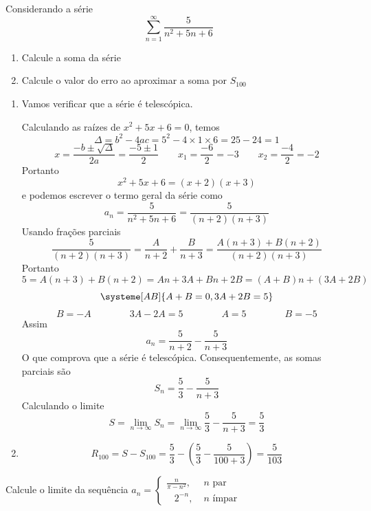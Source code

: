 \documentclass[a4paper,12pt,fleqn]{article}
\begin{document}

Considerando a série
\[
  \sum_{n=1}^{\infty} \frac{5}{n^2 + 5n + 6}
\]
\begin{enumerate}[label=\alph*)]
  \item Calcule a soma da série
  \item Calcule o valor do erro ao aproximar a soma por \(S_{100}\)
\end{enumerate}

\begin{answer}
  \begin{enumerate}[label=\alph*)]
    \item Vamos verificar que a série é telescópica.

    Calculando as raízes de \(x^2 + 5x + 6=0\), temos
    \[
      \Delta
      = b^2 - 4ac
      = 5^2 - 4\times 1\times 6
      = 25 - 24
      = 1
    \]
    \[
      x
      = \frac{-b\pm \sqrt{\Delta}}{2a}
      = \frac{-5\pm 1}{2}
      \qquad
      x_1 = \frac{-6}{2} = -3
      \qquad
      x_2 = \frac{-4}{2} = -2
    \]
    Portanto
    \[
      x^2 + 5x + 6 = (x+2)(x+3)
    \]
    e podemos escrever o termo geral da série como
    \[
      a_n
      = \frac{5}{n^2 + 5n + 6}
      = \frac{5}{(n+2)(n+3)}
    \]
    Usando frações parciais
    \[
      \frac{5}{(n+2)(n+3)}
      = \frac{A}{n+2} + \frac{B}{n+3}
      = \frac{A(n+3) + B(n+2)}{(n+2)(n+3)}
    \]
    Portanto
    \[
      5
      = A(n+3) + B(n+2)
      = An + 3A + Bn + 2B
      = (A+B)n + (3A+2B)
    \]
    \[
      \systeme[AB]
      {
        A+B=0,
        3A+2B=5
      }
    \]
    \[
      B = -A
      \qquad\qquad
      3A-2A = 5
      \qquad\qquad
      A = 5
      \qquad\qquad
      B = -5
    \]
    Assim
    \[
      a_n = \frac{5}{n+2} - \frac{5}{n+3}
    \]
    O que comprova que a série é telescópica. Consequentemente, as somas parciais são
    \[
      S_n = \frac{5}{3} - \frac{5}{n+3}
    \]
    Calculando o limite
    \[
      S
      = \lim_{n\to\infty} S_n
      = \lim_{n\to\infty} \frac{5}{3} - \frac{5}{n+3}
      = \frac{5}{3}
    \]
    \item
    \[
      R_{100}
      = S - S_{100}
      = \frac{5}{3} - \left(\frac{5}{3} - \frac{5}{100+3}\right)
      = \frac{5}{103}
    \]
  \end{enumerate}
\end{answer}

Calcule o limite da sequência
\(
a_n = \begin{cases}
  \frac{n}{\pi-n^2}, & \; n \text{ par}   \\[2mm]
  \;\;\; 2^{-n},    & \; n \text{ ímpar}
\end{cases}
\)
\end{document}
